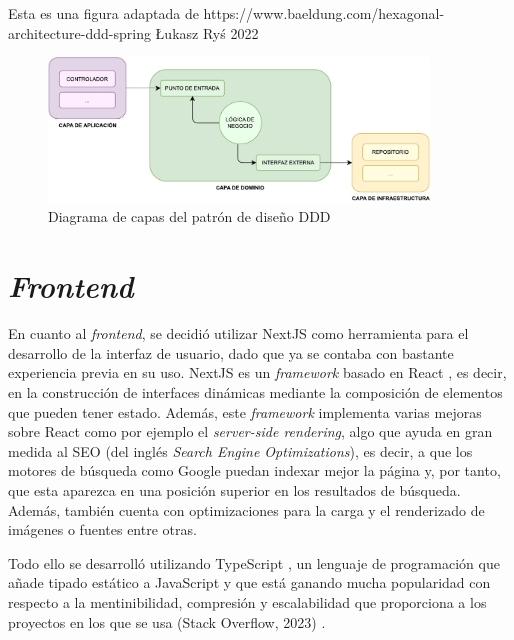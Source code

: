 \bigskip
Esta es una figura adaptada de https://www.baeldung.com/hexagonal-architecture-ddd-spring Łukasz Ryś 2022
\begin{figure}[H]
	\centering
	\includegraphics[width=0.9\textwidth]{diagramas/ddd.pdf}
	\caption{Diagrama de capas del patrón de diseño DDD}
	\label{fig:ddd}
\end{figure}

\section{\textit{Frontend}}
\label{sec:herramientas_frontend}

En cuanto al \textit{frontend}, se decidió utilizar NextJS \cite{nextjs} como herramienta para el desarrollo de la interfaz de usuario, dado que ya
se contaba con bastante experiencia previa en su uso. NextJS es un \textit{framework} basado en React \cite{react}, es decir, en la construcción de interfaces dinámicas mediante la composición
de elementos que pueden tener estado. Además, este \textit{framework} implementa varias mejoras sobre React como por ejemplo el \textit{server-side rendering}, algo que ayuda en gran medida
al SEO (del inglés \textit{Search Engine Optimizations}), es decir, a que los motores de búsqueda como Google puedan indexar mejor la página y, por tanto, que esta aparezca en una posición superior en los resultados de búsqueda.
Además, también cuenta con optimizaciones para la carga y el renderizado de imágenes o fuentes entre otras.

\bigskip
Todo ello se desarrolló utilizando TypeScript \cite{typescript}, un lenguaje de programación que añade tipado estático a JavaScript
y que está ganando mucha popularidad con respecto a la mentinibilidad, compresión y escalabilidad que proporciona a los proyectos en los que se usa (Stack Overflow, 2023) \cite{stackoverflow2023}.

